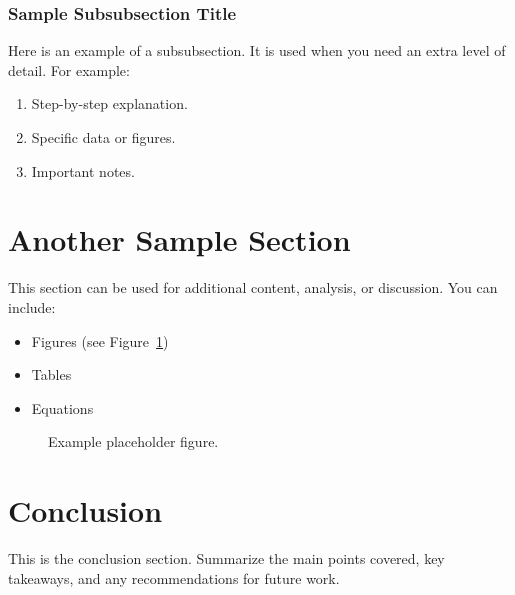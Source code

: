 \documentclass[12pt]{article}
\begin{document}
\subsubsection{Sample Subsubsection Title}
Here is an example of a subsubsection.  
It is used when you need an extra level of detail.  
For example:
\begin{enumerate}
    \item Step-by-step explanation.
    \item Specific data or figures.
    \item Important notes.
\end{enumerate}

\section{Another Sample Section}
This section can be used for additional content, analysis, or discussion.  
You can include:
\begin{itemize}
    \item Figures (see Figure~\ref{fig:sample_fig})
    \item Tables
    \item Equations
\end{itemize}

\begin{figure}[H]       %
    \centering

    \fbox{\rule{0pt}{2in}\rule{2in}{0pt}}
    \caption{Example placeholder figure.}
    \label{fig:sample_fig}
\end{figure}

\section*{Conclusion}   %
This is the conclusion section.  
Summarize the main points covered, key takeaways, and any recommendations for future work.
\end{document}
